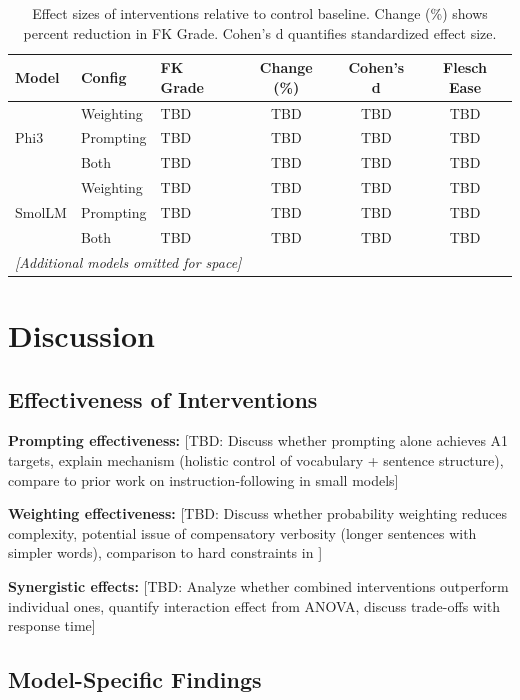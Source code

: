 \documentclass[10pt, a4paper]{article}
\begin{document}
\begin{table}[!ht]
\centering
\small
\begin{tabular}{lllccc}
\hline
\textbf{Model} & \textbf{Config} & \textbf{FK Grade} & \textbf{Change (\%)} & \textbf{Cohen's d} & \textbf{Flesch Ease} \\
\hline
\multirow{3}{*}{Phi3} & Weighting & TBD & TBD & TBD & TBD \\
& Prompting & TBD & TBD & TBD & TBD \\
& Both & TBD & TBD & TBD & TBD \\
\hline
\multirow{3}{*}{SmolLM} & Weighting & TBD & TBD & TBD & TBD \\
& Prompting & TBD & TBD & TBD & TBD \\
& Both & TBD & TBD & TBD & TBD \\
\hline
\multicolumn{6}{l}{\textit{[Additional models omitted for space]}} \\
\hline
\end{tabular}
\caption{Effect sizes of interventions relative to control baseline. Change (\%) shows percent reduction in FK Grade. Cohen's d quantifies standardized effect size.}
\label{tab:effect-sizes}
\end{table}

\section{Discussion}

\subsection{Effectiveness of Interventions}

\textbf{Prompting effectiveness:} [TBD: Discuss whether prompting alone achieves A1 targets, explain mechanism (holistic control of vocabulary + sentence structure), compare to prior work on instruction-following in small models]

\textbf{Weighting effectiveness:} [TBD: Discuss whether probability weighting reduces complexity, potential issue of compensatory verbosity (longer sentences with simpler words), comparison to hard constraints in \citet{Li2024}]

\textbf{Synergistic effects:} [TBD: Analyze whether combined interventions outperform individual ones, quantify interaction effect from ANOVA, discuss trade-offs with response time]

\subsection{Model-Specific Findings}
\end{document}
